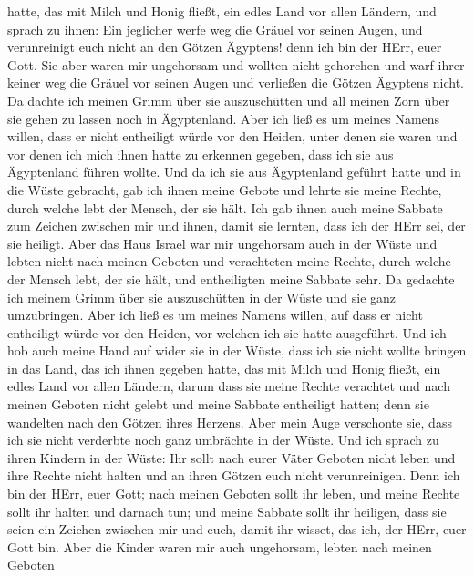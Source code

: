 hatte, das mit Milch und Honig fließt, ein edles Land vor allen Ländern,
 und sprach zu ihnen: Ein jeglicher werfe weg die Gräuel vor
seinen Augen, und verunreinigt euch nicht an den Götzen Ägyptens! denn
ich bin der HErr, euer Gott.  Sie aber waren mir ungehorsam
und wollten nicht gehorchen und warf ihrer keiner weg die Gräuel vor
seinen Augen und verließen die Götzen Ägyptens nicht. Da dachte ich
meinen Grimm über sie auszuschütten und all meinen Zorn über sie gehen
zu lassen noch in Ägyptenland.  Aber ich ließ es um meines
Namens willen, dass er nicht entheiligt würde vor den Heiden, unter
denen sie waren und vor denen ich mich ihnen hatte zu erkennen gegeben,
dass ich sie aus Ägyptenland führen wollte.  Und da ich sie
aus Ägyptenland geführt hatte und in die Wüste gebracht, 
gab ich ihnen meine Gebote und lehrte sie meine Rechte, durch welche
lebt der Mensch, der sie hält.  Ich gab ihnen auch meine
Sabbate zum Zeichen zwischen mir und ihnen, damit sie lernten, dass ich
der HErr sei, der sie heiligt.  Aber das Haus Israel war
mir ungehorsam auch in der Wüste und lebten nicht nach meinen Geboten
und verachteten meine Rechte, durch welche der Mensch lebt, der sie
hält, und entheiligten meine Sabbate sehr. Da gedachte ich meinem Grimm
über sie auszuschütten in der Wüste und sie ganz umzubringen.
 Aber ich ließ es um meines Namens willen, auf dass er
nicht entheiligt würde vor den Heiden, vor welchen ich sie hatte
ausgeführt.  Und ich hob auch meine Hand auf wider sie in
der Wüste, dass ich sie nicht wollte bringen in das Land, das ich ihnen
gegeben hatte, das mit Milch und Honig fließt, ein edles Land vor allen
Ländern,  darum dass sie meine Rechte verachtet und nach
meinen Geboten nicht gelebt und meine Sabbate entheiligt hatten; denn
sie wandelten nach den Götzen ihres Herzens.  Aber mein
Auge verschonte sie, dass ich sie nicht verderbte noch ganz umbrächte in
der Wüste.  Und ich sprach zu ihren Kindern in der Wüste:
Ihr sollt nach eurer Väter Geboten nicht leben und ihre Rechte nicht
halten und an ihren Götzen euch nicht verunreinigen.  Denn
ich bin der HErr, euer Gott; nach meinen Geboten sollt ihr leben, und
meine Rechte sollt ihr halten und darnach tun;  und meine
Sabbate sollt ihr heiligen, dass sie seien ein Zeichen zwischen mir und
euch, damit ihr wisset, das ich, der HErr, euer Gott bin. 
Aber die Kinder waren mir auch ungehorsam, lebten nach meinen Geboten

